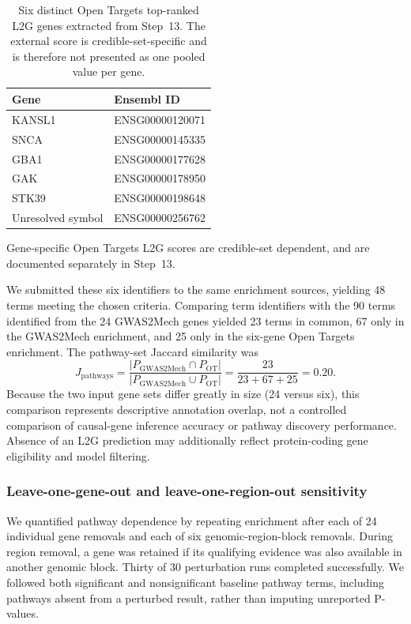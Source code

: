 \documentclass[11pt,a4paper]{article}
\begin{document}
\begin{table}[!htbp]\centering\small\caption{Six distinct Open Targets top-ranked L2G genes extracted from Step~13. The external score is credible-set-specific and is therefore not presented as one pooled value per gene.}\label{tab:step14_ot_six}\begin{tabular}{@{}ll@{}}\toprule Gene & Ensembl ID\\\midrule KANSL1 & ENSG00000120071\\ SNCA & ENSG00000145335\\ GBA1 & ENSG00000177628\\ GAK & ENSG00000178950\\ STK39 & ENSG00000198648\\ Unresolved symbol & ENSG00000256762\\\bottomrule\end{tabular}\end{table} Gene-specific Open Targets L2G scores are credible-set dependent, and are documented separately in Step~13.

We submitted these six identifiers to the same enrichment sources, yielding 48 terms meeting the chosen criteria. Comparing term identifiers with the 90 terms identified from the 24 GWAS2Mech genes yielded 23 terms in common, 67 only in the GWAS2Mech enrichment, and 25 only in the six-gene Open Targets enrichment. The pathway-set Jaccard similarity was
\begin{equation}
J_{\mathrm{pathways}}=\frac{|P_{\mathrm{GWAS2Mech}}\cap P_{\mathrm{OT}}|}{|P_{\mathrm{GWAS2Mech}}\cup P_{\mathrm{OT}}|}=\frac{23}{23+67+25}=0.20.
\end{equation}
Because the two input gene sets differ greatly in size (24 versus six), this comparison represents descriptive annotation overlap, not a controlled comparison of causal-gene inference accuracy or pathway discovery performance. Absence of an L2G prediction may additionally reflect protein-coding gene eligibility and model filtering.

\subsubsection{Leave-one-gene-out and leave-one-region-out sensitivity}
We quantified pathway dependence by repeating enrichment after each of 24 individual gene removals and each of six genomic-region-block removals. During region removal, a gene was retained if its qualifying evidence was also available in another genomic block. Thirty of 30 perturbation runs completed successfully. We followed both significant and nonsignificant baseline pathway terms, including pathways absent from a perturbed result, rather than imputing unreported P-values.
\end{document}
